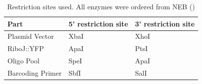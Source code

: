 \begin{table}[]
\centering
\begin{tabular}{|l|l|l|}
\hline
Part             & 5' restriction site & 3' restriction site \\ \hline
Plasmid Vector   & XbaI                & XhoI                \\ \hline
RiboJ::YFP       & ApaI                & PtsI                \\ \hline
Oligo Pool       & SpeI                & ApaI                \\ \hline
Barcoding Primer & SbfI                & SalI                \\ \hline
\end{tabular}
\caption{Restriction sites used. All enzymes were ordered from NEB ()}
\label{tab:re_sites}
\end{table}

